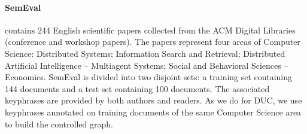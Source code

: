     \paragraph{SemEval~\textnormal{\cite{kim2010semeval}}} contains 244 English
    scientific papers collected from the ACM Digital Libraries (conference and
    workshop papers). The papers represent four areas of Computer Science:
    Distributed Systems; Information Search and Retrieval; Distributed
    Artificial Intelligence -- Multiagent Systems; Social and Behavioral
    Sciences -- Economics. SemEval is divided into two disjoint sets: a training
    set containing 144 documents and a test set containing 100 documents. The
    associated keyphrases are provided by both authors and readers. As we do for
    DUC, we use keyphrases annotated on training documents of the same Computer Science
    area to build the controlled graph.
    
    \begin{table*}
        \centering
        \caption{Results of TopicCoRank and the baselines at 10 keyphrases for each datasets.
                 Precision (P), Recall (R) and F-score (F) are reported in percentages. $\dagger$ indicates
                 a significant F-score improvement over TopicRank and KEA++ at 0.001
                 level using Student’s t-test.
                 \label{tab:comparison_results}}
    \end{table*}
    
